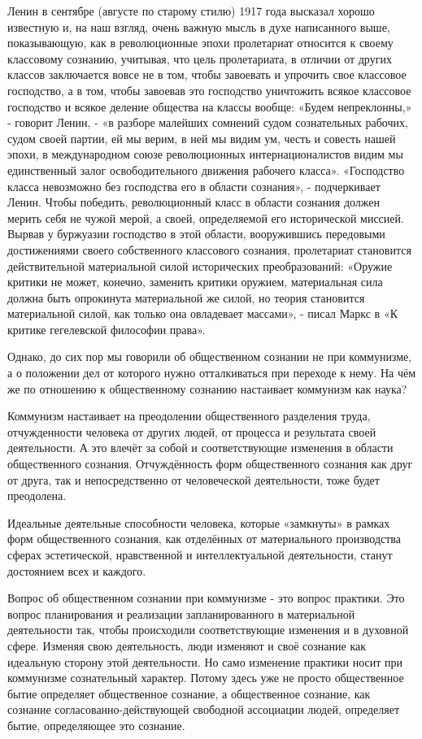 \documentclass[12pt,a4paper,openany]{book}
\begin{document}
Ленин в сентябре (августе по старому стилю) 1917 года высказал хорошо известную и, на наш взгляд, очень важную мысль в духе написанного выше, показывающую, как в революционные эпохи пролетариат относится к своему классовому сознанию, учитывая, что цель пролетариата, в отличии от других классов заключается вовсе не в том, чтобы завоевать и упрочить свое классовое господство, а в том, чтобы завоевав это господство уничтожить всякое классовое господство и всякое деление общества на классы вообще: «Будем непреклонны,» - говорит Ленин, - «в разборе малейших сомнений судом сознательных рабочих, судом своей партии, ей мы верим, в ней мы видим ум, честь и совесть нашей эпохи, в международном союзе революционных интернационалистов видим мы единственный залог освободительного движения рабочего класса». «Господство класса невозможно без господства его в области сознания», - подчеркивает Ленин. Чтобы победить, революционный класс в области сознания должен мерить себя не чужой мерой, а своей, определяемой его исторической миссией. Вырвав у буржуазии господство в этой области, вооружившись передовыми достижениями своего собственного классового сознания, пролетариат становится действительной материальной силой исторических преобразований: «Оружие критики не может, конечно, заменить критики оружием, материальная сила должна быть опрокинута материальной же силой, но теория становится материальной силой, как только она овладевает массами», - писал Маркс в «К критике гегелевской философии права».

Однако, до сих пор мы говорили об общественном сознании не при коммунизме, а о положении дел от которого нужно отталкиваться при переходе к нему. На чём же по отношению к общественному сознанию настаивает коммунизм как наука?

Коммунизм настаивает на преодолении общественного разделения труда, отчужденности человека от других людей, от процесса и результата своей деятельности. А это влечёт за собой и соответствующие изменения в области общественного сознания. Отчуждённость форм общественного сознания как друг от друга, так и непосредственно от человеческой деятельности, тоже будет преодолена.

Идеальные деятельные способности человека, которые «замкнуты» в рамках форм общественного сознания, как отделённых от материального производства сферах эстетической, нравственной и интеллектуальной деятельности, станут достоянием всех и каждого.

Вопрос об общественном сознании при коммунизме - это вопрос практики. Это вопрос планирования и реализации запланированного в материальной деятельности так, чтобы происходили соответствующие изменения и в духовной сфере. Изменяя свою деятельность, люди изменяют и своё сознание как идеальную сторону этой деятельности. Но само изменение практики носит при коммунизме сознательный характер. Потому здесь уже не просто общественное бытие определяет общественное сознание, а общественное сознание, как сознание согласованно-действующей свободной ассоциации людей, определяет бытие, определяющее это сознание.
\end{document}
